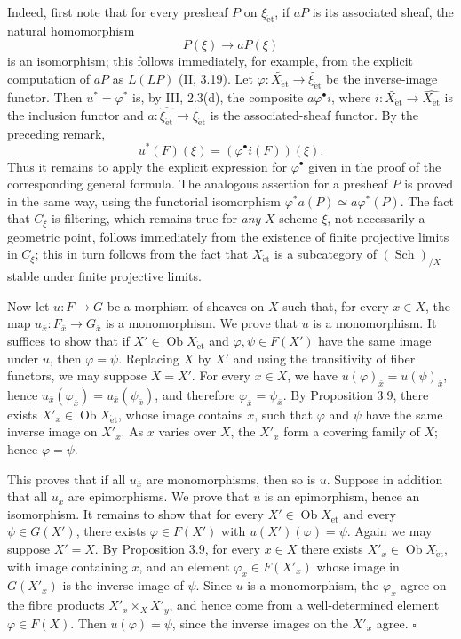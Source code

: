 \documentclass[11pt]{article}
\newcommand{\Sch}{\operatorname{Sch}}
\newcommand{\Ob}{\operatorname{Ob}}
\newcommand{\et}{\mathrm{\acute{e}t}}
\newcommand{\qedtext}{\hfill\(\square\)}
\begin{document}
Indeed, first note that for every presheaf \(P\) on \(\xi_{\et}\), if \(aP\) is its associated sheaf, the natural homomorphism
\[
P(\xi)\longrightarrow aP(\xi)
\]
is an isomorphism; this follows immediately, for example, from the explicit computation of \(aP\) as \(L(LP)\) (II, 3.19). Let \(\varphi:\widetilde{X_{\et}}\to\widetilde{\xi_{\et}}\) be the inverse-image functor. Then \(u^*=\varphi^*\) is, by III, 2.3(d), the composite \(a\varphi^\bullet i\), where \(i:\widetilde{X_{\et}}\to\widehat{X_{\et}}\) is the inclusion functor and \(a:\widehat{\xi_{\et}}\to\widetilde{\xi_{\et}}\) is the associated-sheaf functor. By the preceding remark,
\[
u^*(F)(\xi)=(\varphi^\bullet i(F))(\xi).
\]
Thus it remains to apply the explicit expression for \(\varphi^\bullet\) given in the proof of the corresponding general formula. The analogous assertion for a presheaf \(P\) is proved in the same way, using the functorial isomorphism \(\varphi^*a(P)\simeq a\varphi^*(P)\). The fact that \(C_\xi\) is filtering, which remains true for \emph{any} \(X\)-scheme \(\xi\), not necessarily a geometric point, follows immediately from the existence of finite projective limits in \(C_\xi\); this in turn follows from the fact that \(X_{\et}\) is a subcategory of \((\Sch)_{/X}\) stable under finite projective limits.

Now let \(u:F\to G\) be a morphism of sheaves on \(X\) such that, for every \(x\in X\), the map \(u_{\bar x}:F_{\bar x}\to G_{\bar x}\) is a monomorphism. We prove that \(u\) is a monomorphism. It suffices to show that if \(X'\in\Ob X_{\et}\) and \(\varphi,\psi\in F(X')\) have the same image under \(u\), then \(\varphi=\psi\). Replacing \(X\) by \(X'\) and using the transitivity of fiber functors, we may suppose \(X=X'\). For every \(x\in X\), we have \(u(\varphi)_{\bar x}=u(\psi)_{\bar x}\), hence \(u_{\bar x}(\varphi_{\bar x})=u_{\bar x}(\psi_{\bar x})\), and therefore \(\varphi_{\bar x}=\psi_{\bar x}\). By Proposition 3.9, there exists \(X'_x\in\Ob X_{\et}\), whose image contains \(x\), such that \(\varphi\) and \(\psi\) have the same inverse image on \(X'_x\). As \(x\) varies over \(X\), the \(X'_x\) form a covering family of \(X\); hence \(\varphi=\psi\).

This proves that if all \(u_{\bar x}\) are monomorphisms, then so is \(u\). Suppose in addition that all \(u_{\bar x}\) are epimorphisms. We prove that \(u\) is an epimorphism, hence an isomorphism. It remains to show that for every \(X'\in\Ob X_{\et}\) and every \(\psi\in G(X')\), there exists \(\varphi\in F(X')\) with \(u(X')(\varphi)=\psi\). Again we may suppose \(X'=X\). By Proposition 3.9, for every \(x\in X\) there exists \(X'_x\in\Ob X_{\et}\), with image containing \(x\), and an element \(\varphi_x\in F(X'_x)\) whose image in \(G(X'_x)\) is the inverse image of \(\psi\). Since \(u\) is a monomorphism, the \(\varphi_x\) agree on the fibre products \(X'_x\times_X X'_y\), and hence come from a well-determined element \(\varphi\in F(X)\). Then \(u(\varphi)=\psi\), since the inverse images on the \(X'_x\) agree. \qedtext
\end{document}

